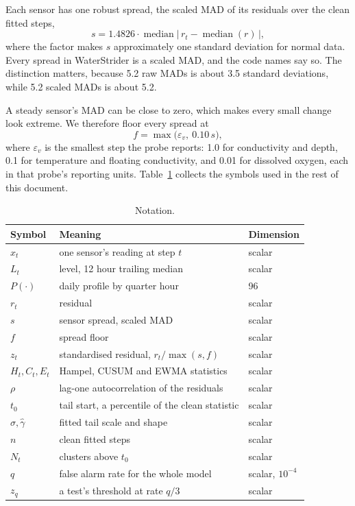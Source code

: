 \documentclass{article}
\begin{document}
Each sensor has one robust spread, the scaled MAD of its residuals over the
clean fitted steps,
\begin{equation}
  s = 1.4826 \cdot \operatorname{median}\big|\, r_{t} - \operatorname{median}(r) \,\big| ,
\end{equation}
where the factor makes $s$ approximately one standard deviation for normal
data. Every spread in WaterStrider is a scaled MAD, and the code names say so.
The distinction matters, because 5.2 raw MADs is about 3.5 standard deviations,
while 5.2 scaled MADs is about 5.2.

A steady sensor's MAD can be close to zero, which makes every small change look
extreme. We therefore floor every spread at
\begin{equation}
  f = \max\big(\varepsilon_{v},\ 0.10\, s\big),
\end{equation}
where $\varepsilon_{v}$ is the smallest step the probe reports: 1.0 for
conductivity and depth, 0.1 for temperature and floating conductivity, and
0.01 for dissolved oxygen, each in that probe's reporting units.
Table~\ref{tab:notation} collects the symbols used in the rest of this
document.

\begin{table}[t]
  \centering
  \caption{Notation.}
  \label{tab:notation}
  \begin{tabular}{lll}
    \toprule
    Symbol & Meaning & Dimension \\
    \midrule
    $x_{t}$ & one sensor's reading at step $t$ & scalar \\
    $L_{t}$ & level, 12 hour trailing median & scalar \\
    $P(\cdot)$ & daily profile by quarter hour & 96 \\
    $r_{t}$ & residual & scalar \\
    $s$ & sensor spread, scaled MAD & scalar \\
    $f$ & spread floor & scalar \\
    $z_{t}$ & standardised residual, $r_{t} / \max(s, f)$ & scalar \\
    $H_{t}, C_{t}, E_{t}$ & Hampel, CUSUM and EWMA statistics & scalar \\
    $\rho$ & lag-one autocorrelation of the residuals & scalar \\
    $t_{0}$ & tail start, a percentile of the clean statistic & scalar \\
    $\hat{\sigma}, \hat{\gamma}$ & fitted tail scale and shape & scalar \\
    $n$ & clean fitted steps & scalar \\
    $N_{t}$ & clusters above $t_{0}$ & scalar \\
    $q$ & false alarm rate for the whole model & scalar, $10^{-4}$ \\
    $z_{q}$ & a test's threshold at rate $q/3$ & scalar \\
    \bottomrule
  \end{tabular}
\end{table}
\end{document}
